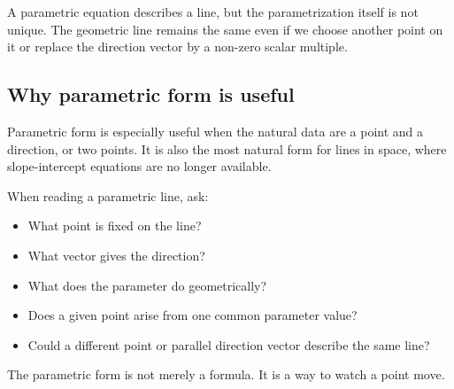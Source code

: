 \begin{remarkbox}
A parametric equation describes a line, but the parametrization itself is not unique. The geometric line remains the same even if we choose another point on it or replace the direction vector by a non-zero scalar multiple.
\end{remarkbox}

\subsection*{Why parametric form is useful}

Parametric form is especially useful when the natural data are a point and a direction, or two points. It is also the most natural form for lines in space, where slope-intercept equations are no longer available.

\begin{summarybox}
When reading a parametric line, ask:
\begin{itemize}
\item What point is fixed on the line?
\item What vector gives the direction?
\item What does the parameter do geometrically?
\item Does a given point arise from one common parameter value?
\item Could a different point or parallel direction vector describe the same line?
\end{itemize}
\end{summarybox}

The parametric form is not merely a formula. It is a way to watch a point move.